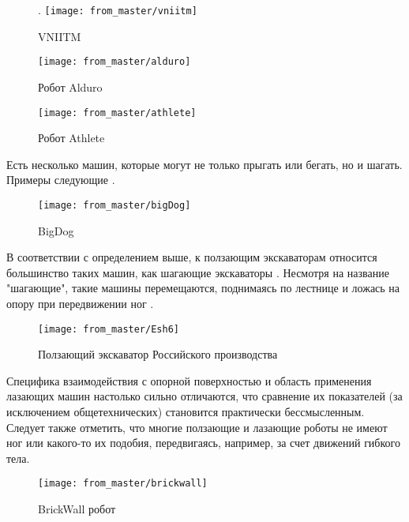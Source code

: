 \begin{figure}[H].
\centering\texttt{[image: from\_master/vniitm]}
\caption{VNIITM}
\label{fig:vniitm}
\end{figure}

\begin{figure}[H]
\centering\texttt{[image: from\_master/alduro]}
\caption{Робот Alduro}
\label{fig:alduro}
\end{figure}

\begin{figure}[H]
\centering\texttt{[image: from\_master/athlete]}
\caption{Робот Athlete}
\label{fig:athlete}
\end{figure}

Есть несколько машин, которые могут не только прыгать или бегать, но и шагать. Примеры следующие \cite{Pavl2013,volkovaModelirovanieDvizheniyaMnogozvennogo2013,bidgoly2010learning,yacunVibrorobotDlyaVertikalnogo2010} .

\begin{figure}[H]
    \centering\texttt{[image: from\_master/bigDog]}
\caption{BigDog}
\label{fig:bigDog}
\end{figure}

В соответствии с определением выше, к ползающим экскаваторам относится большинство таких машин, как шагающие экскаваторы . Несмотря на название "шагающие", такие машины перемещаются, поднимаясь по лестнице и ложась на опору при передвижении ног \cite{peters2010prototype,gradeckiySostoyaniePerspektivyRazvitiya2014,bidgoly2010learning}.

\begin{figure}[H]
\centering\texttt{[image: from\_master/Esh6]}
\caption{Ползающий экскаватор Российского производства}
\label{fig:Esh6}
\end{figure}

 Специфика взаимодействия с опорной поверхностью и область применения лазающих машин настолько сильно отличаются, что сравнение их показателей (за исключением общетехнических) становится практически бессмысленным. Следует также отметить, что многие ползающие и лазающие роботы не имеют ног или какого-то их подобия, передвигаясь, например, за счет движений гибкого тела.

\begin{figure}[H]
\centering\texttt{[image: from\_master/brickwall]}
\caption{BrickWall робот}
\label{fig:brickwall}
\end{figure}

